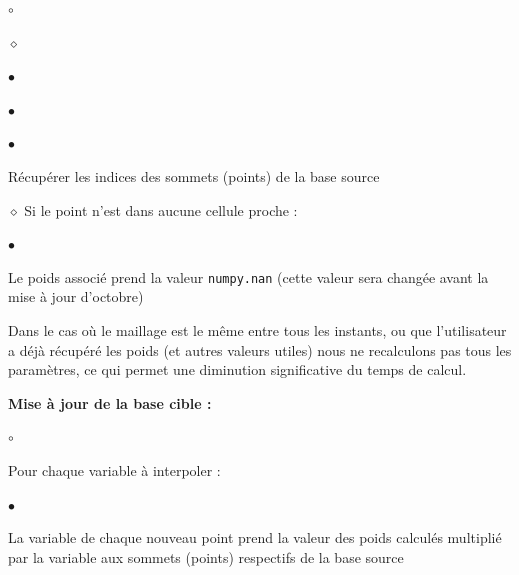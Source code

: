 \begin{list}{$\circ$}{\leftmargin=0.5cm  \itemsep=0cm}
\begin{list}{$\diamond$}{\leftmargin=0.5cm  \itemsep=0cm}
\begin{list}{$\bullet$}{\leftmargin=0.5cm  \itemsep=0cm}
\begin{list}{$\bullet$}{\leftmargin=0.5cm \itemsep=0cm}
\begin{list}{$\bullet$}{\leftmargin=0.5cm  \itemsep=0cm}
                    \item Récupérer les indices des sommets (points) de la base source
                \end{list}
            \end{list}
        \end{list}
    \end{list}
    $\diamond$ Si le point n'est dans aucune cellule proche :
    \begin{list}{$\bullet$}{\leftmargin=0.5cm  \itemsep=0cm}
        \item Le poids associé prend la valeur \texttt{numpy.nan} (cette valeur sera changée avant la mise à jour d'octobre)
    \end{list}
\end{list}

\vspace{0.5cm}

\noindent Dans le cas où le maillage est le même entre tous les instants, ou que l'utilisateur a déjà récupéré les poids (et autres valeurs utiles) nous ne recalculons pas tous les paramètres, ce qui permet une diminution significative du temps de calcul.

\vspace{0.5cm}

\textbf{Mise à jour de la base cible :}
\begin{list}{$\circ$}{\leftmargin=0.5cm  \itemsep=0cm}
    \item Pour chaque variable à interpoler :
    \begin{list}{$\bullet$}{\leftmargin=0.5cm  \itemsep=0cm}
        \item La variable de chaque nouveau point prend la valeur des poids calculés multiplié par la variable aux sommets (points) respectifs de la base source
    \end{list}
\end{list}


